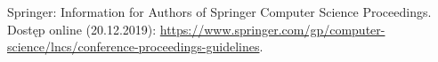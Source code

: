 Springer: Information for Authors of Springer Computer Science Proceedings. Dostęp online (20.12.2019):
\url{https://www.springer.com/gp/computer-science/lncs/conference-proceedings-guidelines}.

